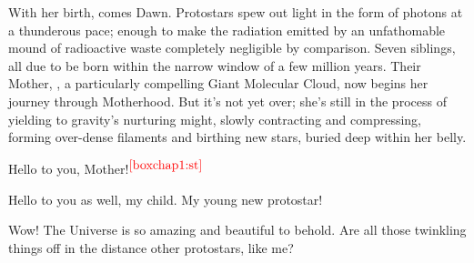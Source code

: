 \documentclass[main.tex]{subfiles}
\begin{document}
\par \nar With her birth, comes Dawn.  Protostars spew out light in the form of photons at a thunderous pace; enough to make the radiation emitted by an unfathomable mound of radioactive waste completely negligible by comparison.  Seven siblings, all due to be born within the narrow window of a few million years. Their Mother, \rmpleione, a particularly compelling Giant Molecular Cloud, now begins her journey through Motherhood.  But it's not yet over; she's still in the process of yielding to gravity's nurturing might, slowly contracting and compressing, forming over-dense filaments and birthing new stars, buried deep within her belly.  


\par \Maia Hello to you, Mother!$^{\textcolor{red}{{\ref{boxchap1:st}}}}$

\par \Pleione Hello to you as well, my child.  My young new protostar!

\par \Maia Wow!  The Universe is so amazing and beautiful to behold.  Are all those twinkling things off in the distance other protostars, like me?
\end{document}
